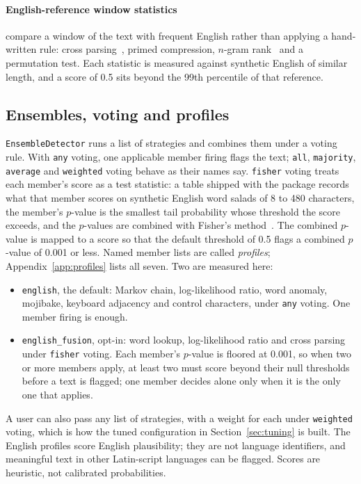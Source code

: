 \documentclass[10pt,twocolumn]{article}
\newcommand{\code}[1]{\texttt{#1}}
\begin{document}
\paragraph{English-reference window statistics} compare a window of the
text with frequent English rather than applying a hand-written rule:
cross parsing~\citep{ziv1993crossparsing}, primed compression, $n$-gram
rank~\citep{cavnar1994ngram} and a permutation test. Each statistic is
measured against synthetic English of similar length,
and a score of 0.5 sits beyond the 99th percentile of that reference.

\subsection{Ensembles, voting and profiles}

\code{EnsembleDetector} runs a list of strategies and combines them
under a voting rule. With \code{any} voting, one applicable member
firing flags the text; \code{all}, \code{majority}, \code{average} and
\code{weighted} voting behave as their names say. \code{fisher} voting
treats each member's score as a test statistic: a table shipped with the
package records what that member scores on synthetic English word salads
of 8 to 480 characters, the member's $p$-value is the smallest tail
probability whose threshold the score exceeds, and the $p$-values are
combined with Fisher's method~\citep{fisher1925}. The combined $p$-value is mapped to a score so that the default
threshold of 0.5 flags a combined $p$-value of 0.001 or less. Named member
lists are called \emph{profiles}; Appendix~\ref{app:profiles} lists all
seven. Two are measured here:

\begin{itemize}\setlength{\itemsep}{1pt}\raggedright
\item \code{english}, the default: Markov chain, log-likelihood ratio,
  word anomaly, mojibake, keyboard adjacency and control characters,
  under \code{any} voting. One member firing is enough.
\item \code{english\_fusion}, opt-in: word lookup, log-likelihood ratio
  and cross parsing under \code{fisher} voting. Each member's $p$-value is
  floored at 0.001, so when two or more members apply, at least two must
  score beyond their null thresholds before a text is flagged; one member
  decides alone only when it is the only one that applies.
\end{itemize}

A user can also pass any list of strategies, with a weight for each under
\code{weighted} voting, which is how the tuned configuration in
Section~\ref{sec:tuning} is built. The English profiles score
English plausibility; they are not language identifiers, and meaningful
text in other Latin-script languages can be flagged. Scores are heuristic,
not calibrated probabilities.
\end{document}
